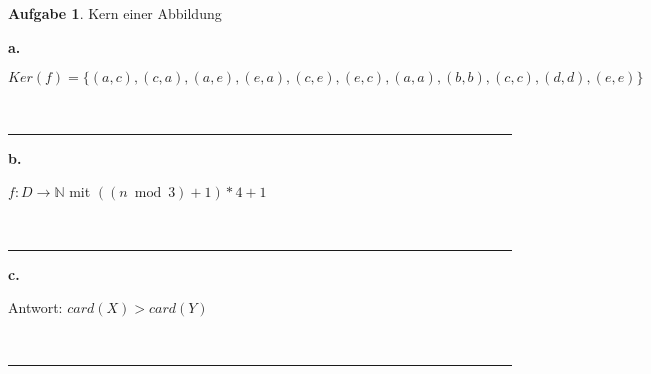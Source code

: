 \documentclass[10pt,leqno ]{article}
\theoremstyle{definition}
\newtheorem{problem}[theorem]{Aufgabe}
\newenvironment{solution}[1][L]{\begin{doublespace}\textbf{#1.}\quad }{\ \rule{0.5em}{0.5em}\end{doublespace}}
\begin{document}
\begin{problem}
    Kern einer Abbildung
\end{problem}
\begin{solution}[a]
    
\( Ker(f) = \{ (a,c), (c,a), (a,e), (e,a), (c,e), (e,c), (a,a), (b,b), (c,c), (d,d), (e,e) \} \)

\end{solution}

\begin{solution}[b]

    \( f:D \rightarrow \mathbb{N} \) mit \( ((n \bmod 3) + 1) * 4 + 1 \)

\end{solution}

\begin{solution}[c]

    Antwort: \( card(X) > card(Y) \)
    
\end{solution}
\end{document}
